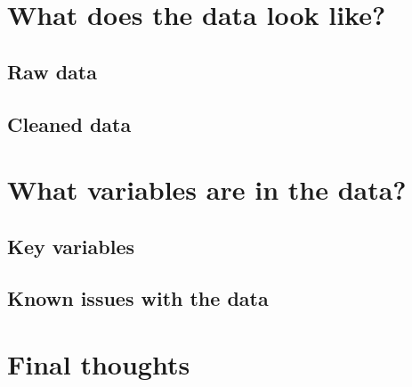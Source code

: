\documentclass[
  12pt,
  openany]{book}
\begin{document}
\hypertarget{what-does-the-data-look-like-6}{%
\section{What does the data look like?}\label{what-does-the-data-look-like-6}}

\hypertarget{raw-data-4}{%
\subsection{Raw data}\label{raw-data-4}}

\hypertarget{cleaned-data}{%
\subsection{Cleaned data}\label{cleaned-data}}

\hypertarget{what-variables-are-in-the-data-6}{%
\section{What variables are in the data?}\label{what-variables-are-in-the-data-6}}

\hypertarget{key-variables-6}{%
\subsection{Key variables}\label{key-variables-6}}

\hypertarget{known-issues-with-the-data-6}{%
\subsection{Known issues with the data}\label{known-issues-with-the-data-6}}

\hypertarget{final-thoughts-6}{%
\section{Final thoughts}\label{final-thoughts-6}}

\backmatter

  
\end{document}
